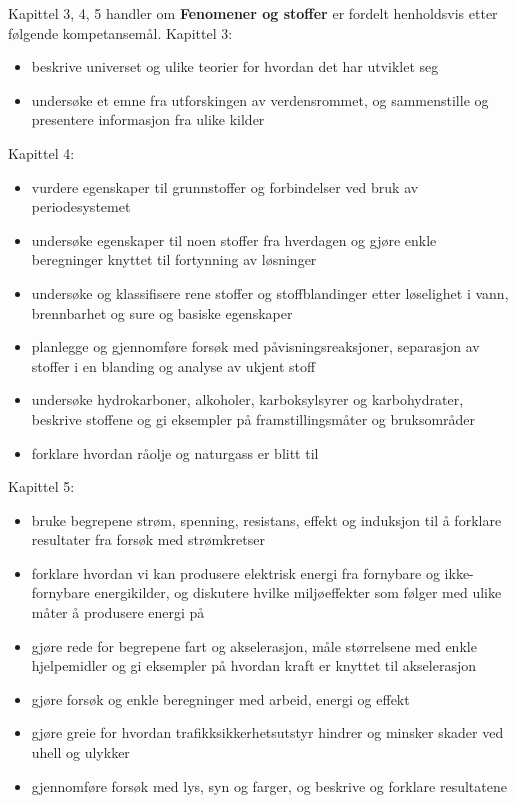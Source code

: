 \documentclass[main.tex]{subfiles}
\begin{document}
Kapittel 3, 4, 5 handler om \textbf{Fenomener og stoffer} er fordelt henholdsvis etter følgende kompetansemål. Kapittel 3:
\begin{itemize}[noitemsep]
\item beskrive universet og ulike teorier for hvordan det har utviklet seg
\item undersøke et emne fra utforskingen av verdensrommet, og sammenstille og presentere informasjon fra ulike kilder
\end{itemize}
Kapittel 4:
\begin{itemize}[noitemsep]
\item vurdere egenskaper til grunnstoffer og forbindelser ved bruk av periodesystemet
\item undersøke egenskaper til noen stoffer fra hverdagen og gjøre enkle beregninger knyttet til fortynning av løsninger
\item undersøke og klassifisere rene stoffer og stoffblandinger etter løselighet i vann, brennbarhet og sure og basiske egenskaper
\item planlegge og gjennomføre forsøk med påvisningsreaksjoner, separasjon av stoffer i en blanding og analyse av ukjent stoff
\item undersøke hydrokarboner, alkoholer, karboksylsyrer og karbohydrater, beskrive stoffene og gi eksempler på framstillingsmåter og bruksområder
\item forklare hvordan råolje og naturgass er blitt til
\end{itemize}
Kapittel 5:
\begin{itemize}[noitemsep]
\item bruke begrepene strøm, spenning, resistans, effekt og induksjon til å forklare resultater fra forsøk med strømkretser
\item forklare hvordan vi kan produsere elektrisk energi fra fornybare og ikke-fornybare energikilder, og diskutere hvilke miljøeffekter som følger med ulike måter å produsere energi på
\item gjøre rede for begrepene fart og akselerasjon, måle størrelsene med enkle hjelpemidler og gi eksempler på hvordan kraft er knyttet til akselerasjon
\item gjøre forsøk og enkle beregninger med arbeid, energi og effekt
\item gjøre greie for hvordan trafikksikkerhetsutstyr hindrer og minsker skader ved uhell og ulykker
\item gjennomføre forsøk med lys, syn og farger, og beskrive og forklare resultatene
\end{itemize}
\end{document}
